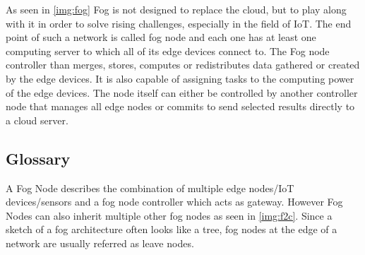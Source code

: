 
As seen in \autoref{img:fog} Fog is not designed to replace the cloud, but to play along with it in order to solve rising challenges, especially in the field of IoT. The end point of such a network is called fog node and each one has at least one computing server to which all of its edge devices connect to. The Fog node controller than merges, stores, computes or redistributes data gathered or created by the edge devices. It is also capable of assigning tasks to the computing power of the edge devices. The node itself can either be controlled by another controller node that manages all edge nodes or commits to send selected results directly to a cloud server.

\subsection{Glossary}

A Fog Node describes the combination of multiple edge nodes/IoT devices/sensors and a fog node controller which acts as gateway. However Fog Nodes can also inherit multiple other fog nodes as seen in \autoref{img:f2c}. Since a sketch of a fog architecture often looks like a tree, fog nodes at the edge of a network are usually referred as leave nodes.


